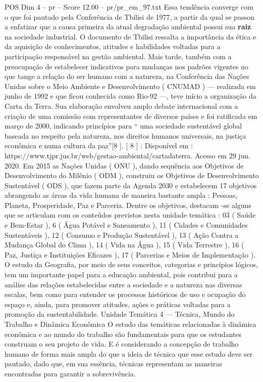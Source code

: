 \begin{textsample}{POS Dim 4 – pr – Score 12.00 – pr/pr\_em\_97.txt}
Essa tendência converge com o que foi pautado pela Conferência de Tbilisi de 1977, a partir da qual se passou a enfatizar que a causa primeira da atual degradação ambiental possui sua \textbf{raiz} na sociedade industrial.
O documento de Tbilisi ressalta a importância da ética e da aquisição de conhecimentos, atitudes e habilidades voltadas para a participação responsável na gestão ambiental.
Mais tarde, também com a preocupação de estabelecer indicativos para mudanças nos padrões vigentes no que tange a relação do ser humano com a natureza, na Conferência das Nações Unidas sobre o Meio Ambiente e Desenvolvimento ( CNUMAD ) — realizada em junho de 1992 e que ficou conhecida como Rio-92 —, teve início a organização da Carta da Terra.
Sua elaboração envolveu amplo debate internacional com a criação de uma comissão com representantes de diversos países e foi ratificada em março de 2000, indicando princípios para “ uma sociedade sustentável global baseada no respeito pela natureza, nos direitos humanos universais, na justiça econômica e numa cultura da paz”[8 ]. [ 8 ] : Disponível em : https://www.tjpr.jus.br/web/gestao-ambiental/cartadaterra.
Acesso em 29 jun. 2020.
Em 2015 as Nações Unidas ( ONU ), dando sequência aos Objetivos de Desenvolvimento do Milênio ( ODM ), construiu os Objetivos de Desenvolvimento Sustentável ( ODS ), que fazem parte da Agenda 2030 e estabelecem 17 objetivos abrangendo as áreas da vida humana de maneira bastante ampla : Pessoas, Planeta, Prosperidade, Paz e Parceria.
Dentre os objetivos, destacam -se alguns que se articulam com os conteúdos previstos nesta unidade temática : 03 ( Saúde e Bem-Estar ), 6 ( Água Potável e Saneamento ), 11 ( Cidades e Comunidades Sustentáveis ), 12 ( Consumo e Produção Sustentável ), 13 ( Ação Contra a Mudança Global do Clima ), 14 ( Vida na Água ), 15 ( Vida Terrestre ), 16 ( Paz, Justiça e Instituições Eficazes ), 17 ( Parcerias e Meios de Implementação ).
O estudo da Geografia, por meio de seus conceitos, categorias e princípios lógicos, tem um importante papel para a educação ambiental, pois contribui para a análise das relações estabelecidas entre a sociedade e a natureza nas diversas escalas, bem como para entender os processos históricos de uso e ocupação do espaço e, ainda, para promover atitudes, ações e práticas voltadas para a promoção da sustentabilidade.
Unidade Temática 4 — Técnica, Mundo do Trabalho e Dinâmica Econômica O estudo das temáticas relacionadas à dinâmica econômica e ao mundo do trabalho são fundamentais para que os estudantes construam o seu projeto de vida.
E é considerando a concepção de trabalho humano de forma mais ampla do que a ideia de técnica que esse estudo deve ser pautado, dado que, em sua essência, técnicas representam as maneiras encontradas para garantir a sobrevivência.

\end{textsample}
